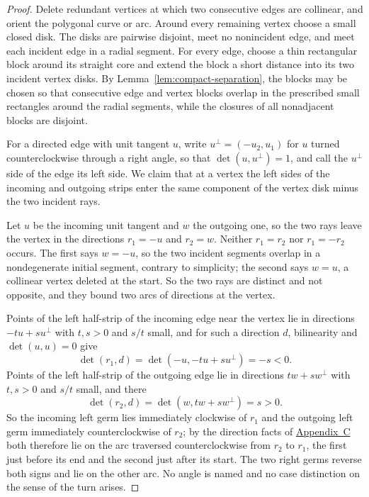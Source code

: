 \documentclass[11pt]{article}
\theoremstyle{mainplain}
\theoremstyle{mainroman}
\theoremstyle{definition}
\numberwithin{equation}{section}
\begin{document}
\begin{proof}
Delete redundant vertices at which two consecutive edges are
collinear, and orient the polygonal curve or arc. Around every remaining
vertex choose a small closed disk. The disks are pairwise disjoint,
meet no nonincident edge, and meet each incident edge in a radial
segment. For every edge, choose a thin rectangular block around its
straight core and extend the block a short distance into its two
incident vertex disks. By Lemma~\ref{lem:compact-separation}, the blocks may
be chosen so that consecutive edge and vertex blocks overlap in the
prescribed small rectangles around the radial segments, while the
closures of all nonadjacent blocks are disjoint.

For a directed edge with unit tangent $u$, write
$u^{\perp}=(-u_2,u_1)$ for $u$ turned counterclockwise through a right
angle, so that $\det(u,u^{\perp})=1$, and call the $u^{\perp}$ side of
the edge its left side. We claim that at a vertex the left sides of the
incoming and outgoing strips enter the same component of the vertex disk
minus the two incident rays.

Let $u$ be the incoming unit tangent and $w$ the outgoing one, so the
two rays leave the vertex in the directions $r_1=-u$ and $r_2=w$.
Neither $r_1=r_2$ nor $r_1=-r_2$ occurs. The first says $w=-u$, so the
two incident segments overlap in a nondegenerate initial segment,
contrary to simplicity; the second says $w=u$, a collinear vertex
deleted at the start. So the two rays are distinct and not opposite, and
they bound two arcs of directions at the vertex.

Points of the left half-strip of the incoming edge near the vertex lie
in directions $-tu+su^{\perp}$ with $t,s>0$ and $s/t$ small, and for
such a direction $d$, bilinearity and $\det(u,u)=0$ give
\[
 \det(r_1,d)=\det(-u,-tu+su^{\perp})=-s<0 .
\]
Points of the left half-strip of the outgoing edge lie in directions
$tw+sw^{\perp}$ with $t,s>0$ and $s/t$ small, and there
\[
 \det(r_2,d)=\det(w,tw+sw^{\perp})=s>0 .
\]
So the incoming left germ lies immediately clockwise of $r_1$ and the
outgoing left germ immediately counterclockwise of $r_2$; by the
direction facts of \hyperref[app:background]{Appendix~C} both therefore
lie on the arc traversed counterclockwise from $r_2$ to $r_1$, the first
just before its end and the second just after its start. The two right
germs reverse both signs and lie on the other arc. No angle is named and
no case distinction on the sense of the turn arises.


\end{proof}
\end{document}

